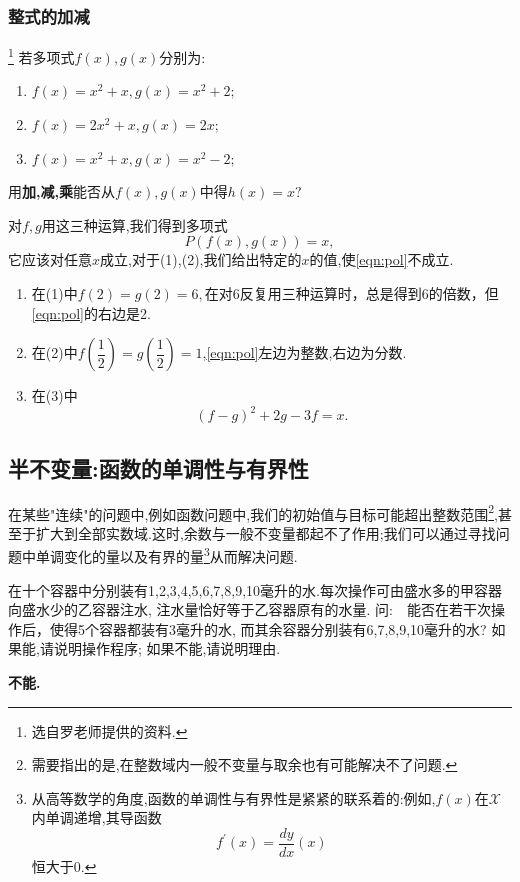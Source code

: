 \subsubsection{整式的加减}
\begin{problem}\footnote{选自罗老师提供的资料.}
    若多项式$f(x),g(x)$分别为:
    \begin{enumerate}
        \item $f(x)=x^2+x,g(x)=x^2+2;$
        \item $f(x)=2x^2+x,g(x)=2x;$
        \item $f(x)=x^2+x,g(x)=x^2-2;$
    \end{enumerate}
    用\textbf{加,减,乘}能否从$f(x),g(x)$中得$h(x)=x?$
\end{problem}
\begin{solution}
    对$f,g$用这三种运算,我们得到多项式\begin{equation}\label{eqn:pol}
        P(f(x),g(x))=x,
    \end{equation}
    它应该对任意$x$成立,对于(1),(2),我们给出特定的$x$的值,使\eqref{eqn:pol}不成立.
    \begin{enumerate}
        \item 在(1)中$f(2)=g(2)=6,$在对6反复用三种运算时，总是得到6的倍数，但\eqref{eqn:pol}的右边是2.
        \item 在(2)中$f(\dfrac{1}{2})=g(\dfrac12)=1$,\eqref{eqn:pol}左边为整数,右边为分数.
        \item 在(3)中$$(f-g)^2+2g-3f=x.$$
    \end{enumerate}
    
    
\end{solution}

\subsection{半不变量:函数的单调性与有界性}
在某些"连续"的问题中,例如函数问题中,我们的初始值与目标可能超出整数范围\footnote{需要指出的是,在整数域内一般不变量与取余也有可能解决不了问题.},甚至于扩大到全部实数域.这时,余数与一般不变量都起不了作用;我们可以通过寻找问题中单调变化的量以及有界的量\footnote{从高等数学的角度,函数的单调性与有界性是紧紧的联系着的:例如,$f(x)$在$\mathcal{X}$内单调递增,其导函数$$f^{\prime}(x)=\dfrac{dy
}{dx}(x)$$恒大于0.}从而解决问题.
\begin{problem}
    在十个容器中分别装有1,2,3,4,5,6,7,8,9,10毫升的水.每次操作可由盛水多的甲容器向盛水少的乙容器注水, 注水量恰好等于乙容器原有的水量. 问:　能否在若干次操作后，使得5个容器都装有3毫升的水, 而其余容器分别装有6,7,8,9,10毫升的水? 如果能,请说明操作程序; 如果不能,请说明理由.
\end{problem}
\begin{solution}
    \textbf{不能.}
\end{solution}
